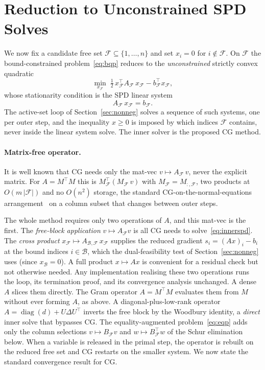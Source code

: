 \section{Reduction to Unconstrained SPD Solves}\label{sec:reduction}

We now fix a candidate free set $\mathcal{F} \subseteq \{1,\dots,n\}$ and set $x_i = 0$ for
$i \notin \mathcal{F}$. On $\mathcal{F}$ the bound-constrained problem~\eqref{eq:bqp} reduces
to the \emph{unconstrained} strictly convex quadratic
\[
  \min_{x_{\mathcal{F}}}\; \tfrac{1}{2}\,x_{\mathcal{F}}^\top A_{\mathcal{F}}\,x_{\mathcal{F}}
    - b_{\mathcal{F}}^\top x_{\mathcal{F}},
\]
whose stationarity condition is the SPD linear system
\begin{equation}\label{eq:innerspd}
  A_{\mathcal{F}}\,x_{\mathcal{F}} = b_{\mathcal{F}}.
\end{equation}
The active-set loop of Section~\ref{sec:nonneg} solves a sequence of such systems, one per
outer step, and the inequality $x \geq 0$ is imposed by which indices $\mathcal{F}$ contains,
never inside the linear system solve. The inner solver is the proposed CG method.

\paragraph{Matrix-free operator.}
It is well known that CG needs only the mat-vec $v \mapsto A_{\mathcal{F}}\,v$, never the explicit matrix. For
$A = M^\top M$ this is $M_{\mathcal{F}}^\top(M_{\mathcal{F}}\,v)$ with
$M_{\mathcal{F}} = M_{:,\mathcal{F}}$, two products at $O(m\,|\mathcal{F}|)$ and no $O(n^2)$
storage, the standard CG-on-the-normal-equations
arrangement~\cite{golub2013,paige1975,choi2006} on a column subset that changes between outer
steps.

The whole method requires only two operations of $A$, and this mat-vec is the first. The
\emph{free-block application} $v \mapsto A_{\mathcal{F}}v$ is all CG needs to
solve~\eqref{eq:innerspd}. The \emph{cross product}
$x_{\mathcal{F}} \mapsto A_{\mathcal{B},\mathcal{F}}\,x_{\mathcal{F}}$ supplies the reduced
gradient $s_i = (Ax)_i - b_i$ at the bound indices $i \in \mathcal{B}$, which the
dual-feasibility test of Section~\ref{sec:nonneg} uses (since $x_{\mathcal{B}} = 0$). A full
product $x \mapsto Ax$ is convenient for a residual check but not otherwise needed. Any implementation realising these two operations runs the loop, its termination proof, and its
convergence analysis unchanged. A dense $A$ slices them directly. The Gram operator
$A = M^\top M$ evaluates them from $M$ without ever forming $A$, as above. A
diagonal-plus-low-rank operator $A = \operatorname{diag}(d) + U\Delta U^\top$ inverts the free
block by the Woodbury identity, a \emph{direct} inner solve that bypasses CG. The
equality-augmented problem~\eqref{eq:eqp} adds only the column selections
$v \mapsto B_{\mathcal{F}}v$ and $w \mapsto B_{\mathcal{F}}^\top w$ of the Schur elimination
below. When a variable is released in the primal step, the operator is rebuilt on the reduced
free set and CG restarts on the smaller system. We now state the standard convergence result
for CG.

